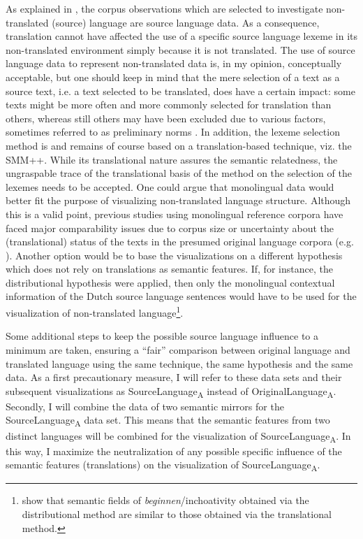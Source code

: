 As explained in , the corpus observations which are selected to investigate non-translated (source) language are source language data. As a consequence, translation cannot have affected the use of a specific source language lexeme in its non-translated environment simply because it is not translated. The use of source language data to represent non-translated data is, in my opinion, conceptually acceptable, but one should keep in mind that the mere selection of a text as a source text, i.e. a text selected to be translated, does have a certain impact: some texts might be more often and more commonly selected for translation than others, whereas still others may have been excluded due to various factors, sometimes referred to as preliminary norms \citep{toury_descriptive_1995}. In addition, the lexeme selection method is and remains of course based on a translation-based technique, viz. the SMM++. While its translational nature assures the semantic relatedness, the ungraspable trace of the translational basis of the method on the selection of the lexemes needs to be accepted. One could argue that monolingual data would better fit the purpose of visualizing non-translated language structure. Although this is a valid point, previous studies using monolingual reference corpora have faced major comparability issues due to corpus size or uncertainty about the (translational) status of the texts in the presumed original language corpora (e.g. \citealt{musolff_conceptual_2014}). Another option would be to base the visualizations on a different hypothesis which does not rely on translations as semantic features. If, for instance, the distributional hypothesis were applied, then only the monolingual contextual information of the Dutch source language sentences would have to be used for the visualization of non-translated language\footnote{\citet{vandevoorde_distributional_2016} show that semantic fields of \textit{beginnen}/inchoativity obtained via the distributional method are similar to those obtained via the translational method.}.

Some additional steps to keep the possible source language influence to a minimum are taken, ensuring a ``fair'' comparison between original language and translated language using the same technique, the same hypothesis and the same data. As a first precautionary measure, I will refer to these data sets and their subsequent visualizations as SourceLanguage\textsubscript{A} instead of OriginalLanguage\textsubscript{A}. Secondly, I will combine the data of two semantic mirrors for the SourceLanguage\textsubscript{A} data set. This means that the semantic features from two distinct languages will be combined for the visualization of SourceLanguage\textsubscript{A}. In this way, I maximize the neutralization of any possible specific influence of the semantic features (translations) on the visualization of SourceLanguage\textsubscript{A}.

